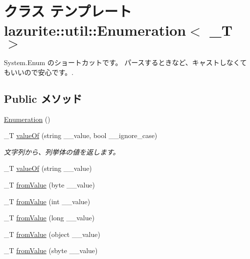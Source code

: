 \hypertarget{classlazurite_1_1util_1_1_enumeration_3_01___t_01_4}{
\section{クラス テンプレート lazurite::util::Enumeration$<$ \_\-T $>$}
\label{classlazurite_1_1util_1_1_enumeration_3_01___t_01_4}
}


System.Enum のショートカットです。 パースするときなど、キャストしなくてもいいので安心です。.  
\subsection*{Public メソッド}
\begin{DoxyCompactItemize}
\item 
\hyperlink{classlazurite_1_1util_1_1_enumeration_3_01___t_01_4_a8a41ed34c656e3b8155e7ddadcf09bf4}{Enumeration} ()
\item 
\_\-T \hyperlink{classlazurite_1_1util_1_1_enumeration_3_01___t_01_4_a493809484770ef37b632b459aef2abad}{valueOf} (string \_\-\_\-value, bool \_\-\_\-ignore\_\-case)
\begin{DoxyCompactList}\small\item\em 文字列から、列挙体の値を返します。 \item\end{DoxyCompactList}\item 
\_\-T \hyperlink{classlazurite_1_1util_1_1_enumeration_3_01___t_01_4_ad57a0adca716d312e6df71427bc850e1}{valueOf} (string \_\-\_\-value)
\item 
\_\-T \hyperlink{classlazurite_1_1util_1_1_enumeration_3_01___t_01_4_a9b48aa615cd8abff86b0bb93c3f79d38}{fromValue} (byte \_\-\_\-value)
\item 
\_\-T \hyperlink{classlazurite_1_1util_1_1_enumeration_3_01___t_01_4_a2fd3755fc87c6a6fd4153425daacde97}{fromValue} (int \_\-\_\-value)
\item 
\_\-T \hyperlink{classlazurite_1_1util_1_1_enumeration_3_01___t_01_4_af361a605b48f0635812956e1a2425afd}{fromValue} (long \_\-\_\-value)
\item 
\_\-T \hyperlink{classlazurite_1_1util_1_1_enumeration_3_01___t_01_4_aa5b7469adb072551effe4793e6b61692}{fromValue} (object \_\-\_\-value)
\item 
\_\-T \hyperlink{classlazurite_1_1util_1_1_enumeration_3_01___t_01_4_ab8a3b7b2534ac097300b957433379108}{fromValue} (sbyte \_\-\_\-value)
\item 

\end{DoxyCompactItemize}
